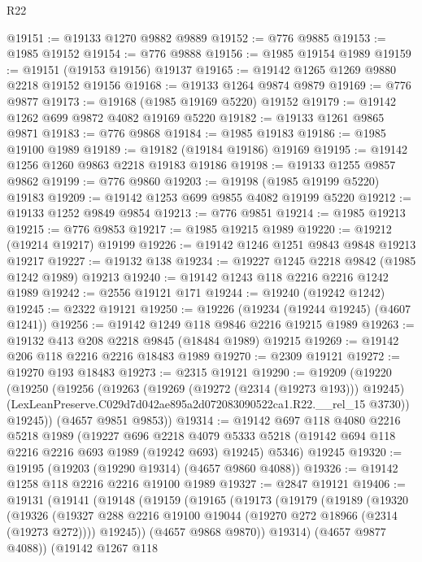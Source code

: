 \begin{lexlean}{R22}
\begin{coremodule}
@19151 := @19133 @1270 @9882 @9889
@19152 := @776 @9885
@19153 := @1985 @19152
@19154 := @776 @9888
@19156 := @1985 @19154 @1989
@19159 := @19151 (@19153 @19156) @19137
@19165 := @19142 @1265 @1269 @9880 @2218 @19152 @19156
@19168 := @19133 @1264 @9874 @9879
@19169 := @776 @9877
@19173 := @19168 (@1985 @19169 @5220) @19152
@19179 := @19142 @1262 @699 @9872 @4082 @19169 @5220
@19182 := @19133 @1261 @9865 @9871
@19183 := @776 @9868
@19184 := @1985 @19183
@19186 := @1985 @19100 @1989
@19189 := @19182 (@19184 @19186) @19169
@19195 := @19142 @1256 @1260 @9863 @2218 @19183 @19186
@19198 := @19133 @1255 @9857 @9862
@19199 := @776 @9860
@19203 := @19198 (@1985 @19199 @5220) @19183
@19209 := @19142 @1253 @699 @9855 @4082 @19199 @5220
@19212 := @19133 @1252 @9849 @9854
@19213 := @776 @9851
@19214 := @1985 @19213
@19215 := @776 @9853
@19217 := @1985 @19215 @1989
@19220 := @19212 (@19214 @19217) @19199
@19226 := @19142 @1246 @1251 @9843 @9848 @19213 @19217
@19227 := @19132 @138
@19234 := @19227 @1245 @2218 @9842 (@1985 @1242 @1989) @19213
@19240 := @19142 @1243 @118 @2216 @2216 @1242 @1989
@19242 := @2556 @19121 @171
@19244 := @19240 (@19242 @1242)
@19245 := @2322 @19121
@19250 := @19226 (@19234 (@19244 @19245) (@4607 @1241))
@19256 := @19142 @1249 @118 @9846 @2216 @19215 @1989
@19263 := @19132 @413 @208 @2218 @9845 (@18484 @1989) @19215
@19269 := @19142 @206 @118 @2216 @2216 @18483 @1989
@19270 := @2309 @19121
@19272 := @19270 @193 @18483
@19273 := @2315 @19121
@19290 := @19209
    (@19220
      (@19250
        (@19256
          (@19263
            (@19269 (@19272 (@2314 (@19273 @193))) @19245)
            (LexLeanPreserve.C029d7d042ae895a2d072083090522ca1.R22.__rel_15 @3730))
          @19245))
      (@4657 @9851 @9853))
@19314 := @19142
    @697
    @118
    @4080
    @2216
    @5218
    @1989
    (@19227
      @696
      @2218
      @4079
      @5333
      @5218
      (@19142 @694 @118 @2216 @2216 @693 @1989 (@19242 @693) @19245)
      @5346)
    @19245
@19320 := @19195 (@19203 (@19290 @19314) (@4657 @9860 @4088))
@19326 := @19142 @1258 @118 @2216 @2216 @19100 @1989
@19327 := @2847 @19121
@19406 := @19131
    (@19141
      (@19148
        (@19159
          (@19165
            (@19173
              (@19179
                (@19189
                  (@19320
                    (@19326
                      (@19327 @288 @2216 @19100 @19044 (@19270 @272 @18966 (@2314 (@19273 @272))))
                      @19245))
                  (@4657 @9868 @9870))
                @19314)
              (@4657 @9877 @4088))
            (@19142
              @1267
              @118

\end{coremodule}
\end{lexlean}
